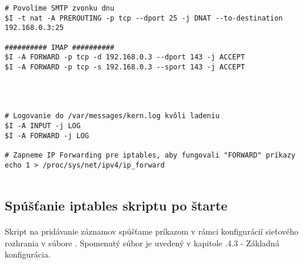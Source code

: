 {\begin{small}
\begin{verbatim}
# Povolíme SMTP zvonku dnu
$I -t nat -A PREROUTING -p tcp --dport 25 -j DNAT --to-destination 192.168.0.3:25

########## IMAP ##########
$I -A FORWARD -p tcp -d 192.168.0.3 --dport 143 -j ACCEPT
$I -A FORWARD -p tcp -s 192.168.0.3 --sport 143 -j ACCEPT




# Logovanie do /var/messages/kern.log kvôli ladeniu
$I -A INPUT -j LOG
$I -A FORWARD -j LOG

# Zapneme IP Forwarding pre iptables, aby fungovali "FORWARD" príkazy
echo 1 > /proc/sys/net/ipv4/ip_forward


\end{verbatim}

\end{small}

}

\subsection{Spúšťanie iptables skriptu po štarte}
\paragraph{}
Skript na pridávanie záznamov  spúšťame príkazom  v rámci konfigurácií sieťového rozhrania  v súbore . Spomenutý súbor je uvedený v kapitole \say.{4.3 - Základná konfigurácia}.